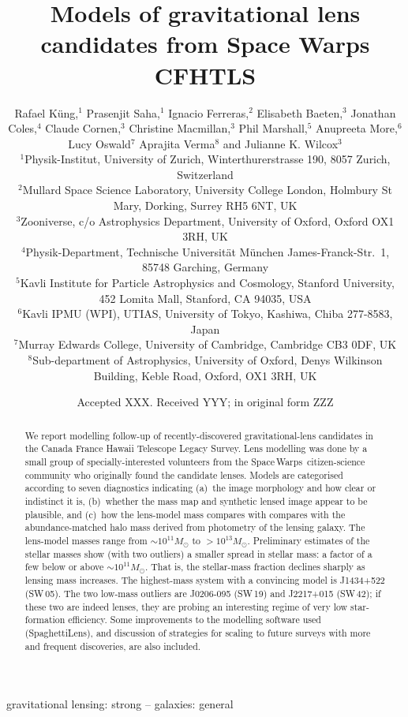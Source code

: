 \documentclass[fleqn,usenatbib]{template/mnras}
\title[Lens models for Space Warps CFHTLS]{Models of gravitational lens candidates from
  Space Warps CFHTLS}
\author[K\"ung et al]{Rafael K\"ung,$^{1}$
Prasenjit Saha,$^{1}$
Ignacio Ferreras,$^{2}$
Elisabeth Baeten,$^{3}$
\newauthor
Jonathan Coles,$^{4}$
Claude Cornen,$^{3}$
Christine Macmillan,$^{3}$
Phil Marshall,$^{5}$ 
\newauthor
Anupreeta More,$^{6}$
Lucy Oswald$^{7}$
Aprajita Verma$^{8}$
and Julianne K. Wilcox$^{3}$
%
\\
%
$^{1}$Physik-Institut, University of Zurich, Winterthurerstrasse 190, 8057 Zurich, Switzerland\\
$^{2}$Mullard Space Science Laboratory, University College London, Holmbury St Mary, Dorking, Surrey RH5 6NT, UK\\
$^{3}$Zooniverse, c/o Astrophysics Department, University of Oxford, Oxford OX1 3RH, UK \\
$^{4}$Physik-Department, Technische Universit\"at M\"unchen
James-Franck-Str.~1, 85748 Garching, Germany\\
$^{5}$Kavli Institute for Particle Astrophysics and Cosmology, Stanford University, 452 Lomita Mall, Stanford, CA 94035, USA\\
$^{6}$Kavli IPMU (WPI), UTIAS, University of Tokyo, Kashiwa, Chiba 277-8583, Japan\\
$^{7}$Murray Edwards College, University of Cambridge, Cambridge CB3 0DF, UK\\
$^{8}$Sub-department of Astrophysics, University of Oxford, Denys Wilkinson Building, Keble Road, Oxford, OX1 3RH, UK\\
}
\date{Accepted XXX. Received YYY; in original form ZZZ}
\newcommand{\SW}{Space\,Warps\xspace}
\newcommand{\sw}[1]{SW\,#1\xspace}
\begin{document}
\label{firstpage}
\pagerange{\pageref{firstpage}--\pageref{lastpage}}
\maketitle

\begin{abstract}
We report modelling follow-up of recently-discovered
gravitational-lens candidates in the Canada France Hawaii Telescope
Legacy Survey. Lens modelling was done by a small group of
specially-interested volunteers from the \SW\ citizen-science community
who originally found the candidate lenses.  Models are categorised
according to seven diagnostics indicating (a)~the image morphology and
how clear or indistinct it is, (b)~whether the mass map and synthetic
lensed image appear to be plausible, and (c)~how the lens-model mass
compares with compares with the abundance-matched halo mass derived
from photometry of the lensing galaxy.
The lens-model masses range from $\sim10^{11}M_\odot$ to
$>10^{13}M_\odot$.  Preliminary estimates of the stellar masses show
(with two outliers) a smaller spread in stellar mass: a factor of a
few below or above $\sim10^{11}M_\odot$.  That is, the stellar-mass
fraction declines sharply as lensing mass increases.  The highest-mass
system with a convincing model is J1434+522 (\sw{05}).  The two low-mass
outliers are J0206-095 (\sw{19}) and J2217+015 (\sw{42}); if these two are
indeed lenses, they are probing an interesting regime of very low
star-formation efficiency.
Some improvements to the modelling software used (SpaghettiLens), and
discussion of strategies for scaling to future surveys with more and
frequent discoveries, are also included.
\end{abstract}

\begin{keywords}
gravitational lensing: strong -- galaxies: general
\end{keywords}














\end{document}
